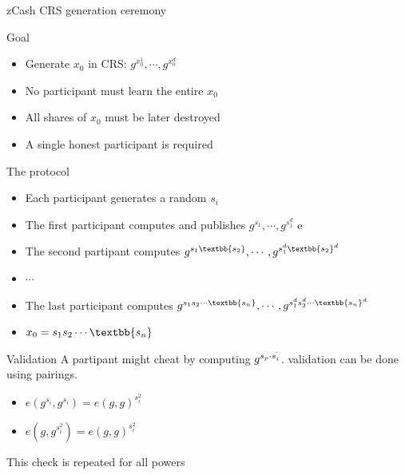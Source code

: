 \documentclass[handouts]{beamer}
\begin{document}
\begin{frame}[allowframebreaks]{zCash CRS generation ceremony}
    \begin{block}{Goal}
        \begin{itemize}
            \item Generate $x_0$ in CRS: $g^{x_0^1}, \cdots, g^{x_0^d}$
            \item No participant must learn the entire $x_0$
            \item All shares of $x_0$ must be later destroyed
            \item A single honest participant is required
        \end{itemize}
    \end{block} \pause
    \framebreak
    \begin{block}{The protocol}
        \begin{itemize}
            \item Each participant generates a random $s_i$  
            \item The first participant computes and publishes $g^{s_1}, \cdots, g^{s_1^d}$    e
            \item The second partipant computes $g^{s_1 \textbb{s_2}}, \cdots, g^{s_1^d \textbb{s_2}^d}$  
            \item $\cdots$  
            \item The last participant computes $g^{s_1 s_2 \cdots \textbb{s_n}}, \cdots, g^{s_1^d s_2^d \cdots \textbb{s_n}^d}$  
            \item $x_0 = s_1 s_2 \cdots \textbb{s_n}$  
        \end{itemize} 
    \end{block}
    \framebreak
    \begin{block}{Validation}
         A partipant might cheat by computing $g^{s_p \cdot s_i^`}$. validation can be done using pairings.
         \begin{itemize}
            \item $e(g^{s_i},g^{s_i})=e(g,g)^{s_i^2}$  
            \item $e(g,g^{s_i^2})=e(g,g)^{s_i^2}$  
         \end{itemize}
         This check is repeated for all powers 
    \end{block}
\end{frame}
\end{document}
